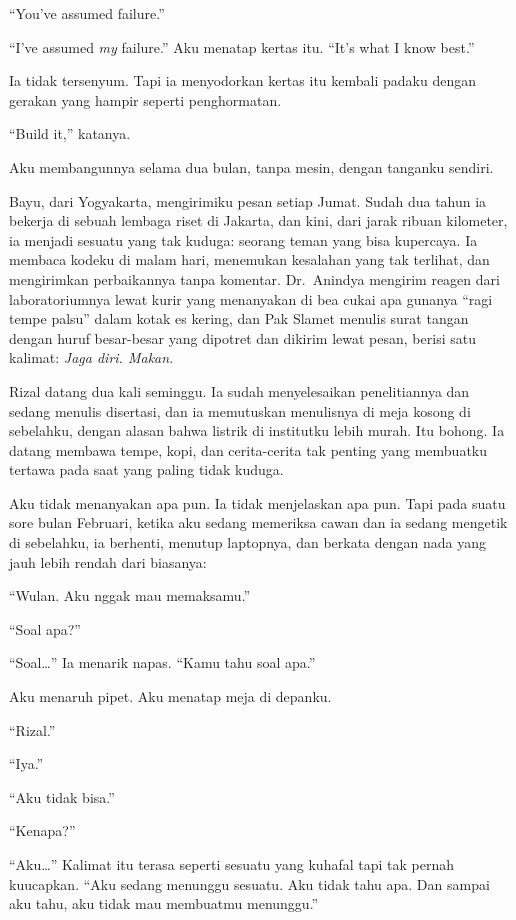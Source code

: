 \documentclass[11pt,twoside,openany]{book}
\makeatletter
\newcommand{\scenebreak}{\par\vspace{0.9em}{\centering\textsc{*\hspace{0.7em}*\hspace{0.7em}*}\par}\vspace{0.9em}\@afterindentfalse\@afterheading}
\makeatother
\begin{document}
``You've assumed failure.''

``I've assumed \emph{my} failure.'' Aku menatap kertas itu. ``It's what I know best.''

Ia tidak tersenyum. Tapi ia menyodorkan kertas itu kembali padaku dengan gerakan yang hampir seperti penghormatan.

``Build it,'' katanya.

\scenebreak
Aku membangunnya selama dua bulan, tanpa mesin, dengan tanganku sendiri.

Bayu, dari Yogyakarta, mengirimiku pesan setiap Jumat. Sudah dua tahun ia bekerja di sebuah lembaga riset di Jakarta, dan kini, dari jarak ribuan kilometer, ia menjadi sesuatu yang tak kuduga: seorang teman yang bisa kupercaya. Ia membaca kodeku di malam hari, menemukan kesalahan yang tak terlihat, dan mengirimkan perbaikannya tanpa komentar. Dr.~Anindya mengirim reagen dari laboratoriumnya lewat kurir yang menanyakan di bea cukai apa gunanya ``ragi tempe palsu'' dalam kotak es kering, dan Pak Slamet menulis surat tangan dengan huruf besar-besar yang dipotret dan dikirim lewat pesan, berisi satu kalimat: \emph{Jaga diri. Makan.}

Rizal datang dua kali seminggu. Ia sudah menyelesaikan penelitiannya dan sedang menulis disertasi, dan ia memutuskan menulisnya di meja kosong di sebelahku, dengan alasan bahwa listrik di institutku lebih murah. Itu bohong. Ia datang membawa tempe, kopi, dan cerita-cerita tak penting yang membuatku tertawa pada saat yang paling tidak kuduga.

Aku tidak menanyakan apa pun. Ia tidak menjelaskan apa pun. Tapi pada suatu sore bulan Februari, ketika aku sedang memeriksa cawan dan ia sedang mengetik di sebelahku, ia berhenti, menutup laptopnya, dan berkata dengan nada yang jauh lebih rendah dari biasanya:

``Wulan. Aku nggak mau memaksamu.''

``Soal apa?''

``Soal\ldots{}'' Ia menarik napas. ``Kamu tahu soal apa.''

Aku menaruh pipet. Aku menatap meja di depanku.

``Rizal.''

``Iya.''

``Aku tidak bisa.''

``Kenapa?''

``Aku\ldots{}'' Kalimat itu terasa seperti sesuatu yang kuhafal tapi tak pernah kuucapkan. ``Aku sedang menunggu sesuatu. Aku tidak tahu apa. Dan sampai aku tahu, aku tidak mau membuatmu menunggu.''
\end{document}
